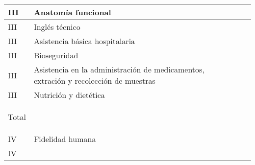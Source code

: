 \documentclass[9pt,a4paper]{article}
\begin{document}
\begin{table}[ht]
\begin{tabular}{|m{0.7cm}|m{7cm}|m{1.4cm}|m{1.4cm}|m{1.4cm}|m{1.4cm}|}
		{\parbox{0.7cm}{\centering III}}     & 
		Anatomía funcional                   & 
		{\parbox{1.4cm}{ }}      & 
		{\parbox{1.4cm}{}}      & 
		{\parbox{1.4cm}{ }}     & 
		{\parbox{1.4cm}{ }}     \\
		\hline
		{\parbox{0.7cm}{\centering III}}     & 
		Inglés técnico                       & 
		{\parbox{1.4cm}{ }}      & 
		{\parbox{1.4cm}{}}      & 
		{\parbox{1.4cm}{ }}      & 
		{\parbox{1.4cm}{ }}     \\
		\hline
		{\parbox{0.7cm}{\centering III}}     & 
		Asistencia básica hospitalaria       & 
		{\parbox{1.4cm}{ }}      & 
		{\parbox{1.4cm}{}}      & 
		{\parbox{1.4cm}{ }}     & 
		{\parbox{1.4cm}{ }}    \\
		\hline
		{\parbox{0.7cm}{\centering III}}     & 
		Bioseguridad                         & 
		{\parbox{1.4cm}{ }}      & 
		{\parbox{1.4cm}{}}      & 
		{\parbox{1.4cm}{ }}     & 
		{\parbox{1.4cm}{ }}     \\
		\hline
		{\parbox{0.7cm}{\centering III}}     & 
		Asistencia en la administración de medicamentos, extración y recolección de muestras & 
		{\parbox{1.4cm}{ }}      & 
		{\parbox{1.4cm}{}}      & 
		{\parbox{1.4cm}{ }}     & 
		{\parbox{1.4cm}{ }}     \\
		\hline
		{\parbox{0.7cm}{\centering III}}     & 
		Nutrición y dietética                & 
		{\parbox{1.4cm}{ }}      & 
		{\parbox{1.4cm}{}}      & 
		{\parbox{1.4cm}{ }}     & 
		{\parbox{1.4cm}{ }}     \\
		\hline
		\rowcolor{azul}
		\textcolor{blanco}{\parbox{0.7cm}{\centering Total}}    & 
		                                                        & 
		\textcolor{blanco}{\parbox{1.4cm}{ }}      & 
		\textcolor{blanco}{\parbox{1.4cm}{ }}     & 
		\textcolor{blanco}{\parbox{1.4cm}{  }}    & 
		\textcolor{blanco}{\parbox{1.4cm}{ }}     \\
		\hline
		{\parbox{0.7cm}{\centering IV}}      & 
		Fidelidad humana                     & 
		{\parbox{1.4cm}{ }}      & 
		{\parbox{1.4cm}{}}      & 
		{\parbox{1.4cm}{ }}     & 
		{\parbox{1.4cm}{ }}     \\
		\hline
		{\parbox{0.7cm}{\centering IV}}      & 

\end{tabular}
\end{table}
\end{document}
